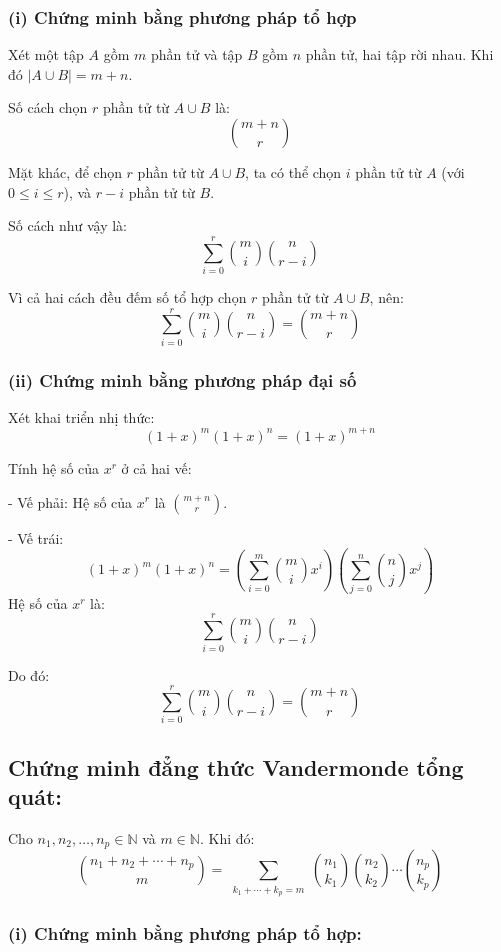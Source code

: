 \documentclass{article}
\begin{document}
	 \subsubsection*{(i) Chứng minh bằng phương pháp tổ hợp}
		 
	 Xét một tập $A$ gồm $m$ phần tử và tập $B$ gồm $n$ phần tử, hai tập rời nhau. Khi đó $|A \cup B| = m + n$.
	 
	 Số cách chọn $r$ phần tử từ $A \cup B$ là:
	 \[
	 \binom{m + n}{r}
	 \]
	 
	 Mặt khác, để chọn $r$ phần tử từ $A \cup B$, ta có thể chọn $i$ phần tử từ $A$ (với $0 \le i \le r$), và $r - i$ phần tử từ $B$.
	 
	 Số cách như vậy là:
	 \[
	 \sum_{i = 0}^{r} \binom{m}{i} \binom{n}{r - i}
	 \]
	 
	 Vì cả hai cách đều đếm số tổ hợp chọn $r$ phần tử từ $A \cup B$, nên:
	 \[
	 \sum_{i=0}^{r} \binom{m}{i} \binom{n}{r - i} = \binom{m + n}{r}
	 \]
	
	\subsubsection*{(ii) Chứng minh bằng phương pháp đại số}
	Xét khai triển nhị thức:
	\[
	(1 + x)^m (1 + x)^n = (1 + x)^{m + n}
	\]
	
	Tính hệ số của $x^r$ ở cả hai vế:
	
	- Vế phải: Hệ số của $x^r$ là $\binom{m + n}{r}$.
	
	- Vế trái:
	\[
	(1 + x)^m (1 + x)^n = \left( \sum_{i=0}^{m} \binom{m}{i} x^i \right) \left( \sum_{j=0}^{n} \binom{n}{j} x^j \right)
	\]
	Hệ số của $x^r$ là:
	\[
	\sum_{i = 0}^{r} \binom{m}{i} \binom{n}{r - i}
	\]
	
	Do đó:
	\[
	\sum_{i = 0}^{r} \binom{m}{i} \binom{n}{r - i} = \binom{m + n}{r}
	\]
	
	\subsection*{Chứng minh đẳng thức Vandermonde tổng quát:}
	
	Cho $n_1, n_2, \ldots, n_p \in \mathbb{N}$ và $m \in \mathbb{N}$. Khi đó:
	\[
	\binom{n_1 + n_2 + \cdots + n_p}{m}
	= \sum_{\substack{k_1 + \cdots + k_p = m}} \binom{n_1}{k_1} \binom{n_2}{k_2} \cdots \binom{n_p}{k_p}
	\]
	
	\subsubsection*{(i) Chứng minh bằng phương pháp tổ hợp:}
	
\end{document}
